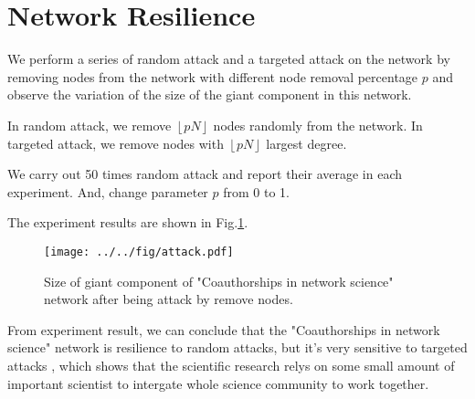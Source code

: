 \documentclass[runningheads]{llncs}
\begin{document}
\section{Network Resilience}

We perform a series of random attack and a targeted attack on the network
by removing nodes from the network with different node removal percentage $p$
and observe the variation of the size of the giant component in this network.

In random attack, we remove $\left\lfloor p N\right\rfloor$ nodes randomly from the network.
In targeted attack, we remove nodes with $\left\lfloor p N\right\rfloor$ largest degree.

We carry out 50 times random attack and report their average in each experiment.
And, change parameter $p$ from 0 to 1.

The experiment results are shown in Fig.\ref{fig:attack}.

\begin{figure}
    \centering
    \texttt{[image: ../../fig/attack.pdf]}
    \caption{Size of giant component of "Coauthorships in network science" network after being attack by remove nodes.} 
    \label{fig:attack}
\end{figure}

From experiment result, we can conclude that the "Coauthorships in network science" network 
is resilience to random attacks, but it's very sensitive to targeted attacks
, which shows that the scientific research relys on some small 
amount of important scientist to intergate whole science community to work together.

\end{document}
